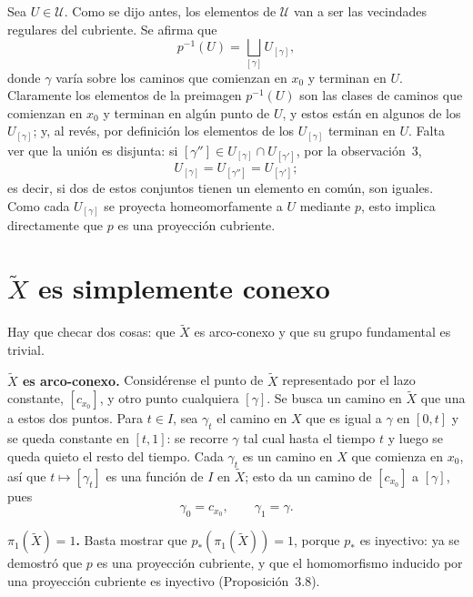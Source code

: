 \documentclass[11pt]{article}
\begin{document}
Sea $U\in\mathcal U$. Como se dijo antes, los elementos de $\mathcal U$ van a ser las vecindades regulares del cubriente. Se afirma que
\[
  p^{-1}(U)=\bigsqcup_{[\gamma]}U_{[\gamma]},
\]
donde $\gamma$ varía sobre los caminos que comienzan en $x_0$ y terminan en $U$. Claramente los elementos de la preimagen $p^{-1}(U)$ son las clases de caminos que comienzan en $x_0$ y terminan en algún punto de $U$, y estos están en algunos de los $U_{[\gamma]}$; y, al revés, por definición los elementos de los $U_{[\gamma]}$ terminan en $U$. Falta ver que la unión es disjunta: si $[\gamma'']\in U_{[\gamma]}\cap U_{[\gamma']}$, por la observación~3,
\[
  U_{[\gamma]}=U_{[\gamma'']}=U_{[\gamma']} ;
\]
es decir, si dos de estos conjuntos tienen un elemento en común, son iguales. Como cada $U_{[\gamma]}$ se proyecta homeomorfamente a $U$ mediante $p$, esto implica directamente que $p$ es una proyección cubriente.

\section*{$\tilde X$ es simplemente conexo}

Hay que checar dos cosas: que $\tilde X$ es arco-conexo y que su grupo fundamental es trivial.

\medskip\noindent\textbf{$\tilde X$ es arco-conexo.} Considérense el punto de $\tilde X$ representado por el lazo constante, $[c_{x_0}]$, y otro punto cualquiera $[\gamma]$. Se busca un camino en $\tilde X$ que una a estos dos puntos. Para $t\in I$, sea $\gamma_t$ el camino en $X$ que es igual a $\gamma$ en $[0,t]$ y se queda constante en $[t,1]$: se recorre $\gamma$ tal cual hasta el tiempo $t$ y luego se queda quieto el resto del tiempo. Cada $\gamma_t$ es un camino en $X$ que comienza en $x_0$, así que $t\mapsto[\gamma_t]$ es una función de $I$ en $\tilde X$; esto da un camino de $[c_{x_0}]$ a $[\gamma]$, pues
\[
  \gamma_0=c_{x_0},\qquad\gamma_1=\gamma .
\]

\medskip\noindent\textbf{$\pi_1(\tilde X)=1$.} Basta mostrar que $p_*(\pi_1(\tilde X))=1$, porque $p_*$ es inyectivo: ya se demostró que $p$ es una proyección cubriente, y que el homomorfismo inducido por una proyección cubriente es inyectivo (Proposición~3.8).
\end{document}
